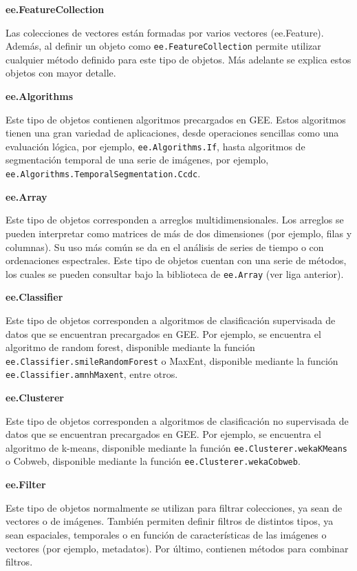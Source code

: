 \documentclass[
  12pt,
  letterpaper,
  twoside]{book}
\begin{document}
\textbf{ee.FeatureCollection}

Las colecciones de vectores están formadas por varios vectores (ee.Feature). Además, al definir un objeto como \texttt{ee.FeatureCollection} permite utilizar cualquier método definido para este tipo de objetos. Más adelante se explica estos objetos con mayor detalle.

\textbf{ee.Algorithms}

Este tipo de objetos contienen algoritmos precargados en GEE. Estos algoritmos tienen una gran variedad de aplicaciones, desde operaciones sencillas como una evaluación lógica, por ejemplo, \texttt{ee.Algorithms.If}, hasta algoritmos de segmentación temporal de una serie de imágenes, por ejemplo, \texttt{ee.Algorithms.TemporalSegmentation.Ccdc}.

\textbf{ee.Array}

Este tipo de objetos corresponden a arreglos multidimensionales. Los arreglos se pueden interpretar como matrices de más de dos dimensiones (por ejemplo, filas y columnas). Su uso más común se da en el análisis de series de tiempo o con ordenaciones espectrales. Este tipo de objetos cuentan con una serie de métodos, los cuales se pueden consultar bajo la biblioteca de \texttt{ee.Array} (ver liga anterior).

\textbf{ee.Classifier}

Este tipo de objetos corresponden a algoritmos de clasificación supervisada de datos que se encuentran precargados en GEE. Por ejemplo, se encuentra el algoritmo de random forest, disponible mediante la función \texttt{ee.Classifier.smileRandomForest} o MaxEnt, disponible mediante la función \texttt{ee.Classifier.amnhMaxent}, entre otros.

\textbf{ee.Clusterer}

Este tipo de objetos corresponden a algoritmos de clasificación no supervisada de datos que se encuentran precargados en GEE. Por ejemplo, se encuentra el algoritmo de k-means, disponible mediante la función \texttt{ee.Clusterer.wekaKMeans} o Cobweb, disponible mediante la función \texttt{ee.Clusterer.wekaCobweb}.

\textbf{ee.Filter}

Este tipo de objetos normalmente se utilizan para filtrar colecciones, ya sean de vectores o de imágenes. También permiten definir filtros de distintos tipos, ya sean espaciales, temporales o en función de características de las imágenes o vectores (por ejemplo, metadatos). Por último, contienen métodos para combinar filtros.
\end{document}
